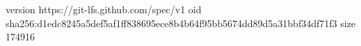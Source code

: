version https://git-lfs.github.com/spec/v1
oid sha256:d1edc8245a5def5af1ff838695ece8b4b64f95bb5674dd89d5a31bbf34df71f3
size 174916
